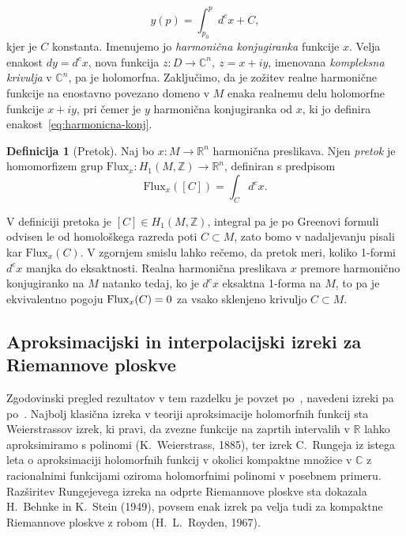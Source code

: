 \documentclass[12pt,a4paper,twoside]{article}
\theoremstyle{definition} %
\newtheorem{definicija}{Definicija}[section]
\theoremstyle{plain} %
\numberwithin{equation}{section}  %
\newcommand{\R}{\mathbb R}
\newcommand{\Z}{\mathbb Z}
\newcommand{\C}{\mathbb C}
\begin{document}
\begin{equation} \label{eq:harmonicna-konj}
y(p) = \int_{p_0}^{p} d^{c}x + C,
\end{equation}
kjer je $C$ konstanta. Imenujemo jo \emph{harmonična konjugiranka} funkcije $x$. Velja enakost $dy = d^{c}x$, nova funkcija $z \colon D \to \mathbb{C}^{n}, \ z = x+iy$, imenovana \emph{kompleksna krivulja} v $\mathbb{C}^{n}$, pa je holomorfna. Zaključimo, da je zožitev realne harmonične funkcije na enostavno povezano domeno v $M$ enaka realnemu delu holomorfne funkcije $x+iy$, pri čemer je $y$ harmonična konjugiranka od $x$, ki jo definira enakost~\eqref{eq:harmonicna-konj}.

\begin{definicija} [Pretok]
Naj bo $x \colon M \to \R^{n}$ harmonična preslikava. Njen \emph{pretok} je homomorfizem grup $\text{Flux}_{x} \colon H_{1} (M, \Z) \to \R^{n}$, definiran s predpisom 
\begin{equation} \label{eq:pretok}
\text{Flux}_{x} ([C]) = \int_{C} {d^{c} x}.
\end{equation}
\end{definicija}
%
V definiciji pretoka je $[C] \in H_{1} (M, \Z)$, integral pa je po Greenovi formuli odvisen le od homološkega razreda poti $C \subset M$, zato bomo v nadaljevanju pisali kar $\text{Flux}_{x} (C)$. V zgornjem smislu lahko rečemo, da pretok meri, koliko 1-formi $d^{c}x$ manjka do eksaktnosti. Realna harmonična preslikava $x$ premore harmonično konjugiranko na $M$ natanko tedaj, ko je $d^{c}x$ eksaktna 1-forma na $M$, to pa je ekvivalentno pogoju $\textup{Flux}_{x}(C)=0$ za vsako sklenjeno krivuljo $C \subset M$.

\subsection{Aproksimacijski in interpolacijski izreki za Riemannove ploskve}
%
Zgodovinski pregled rezultatov v tem razdelku je povzet po~\cite{fornaess2020holomorphic}, navedeni izreki pa po~\cite[Section~1.12]{alarcon2021minimal}. \newline
Najbolj klasična izreka v teoriji aproksimacije holomorfnih funkcij sta Weierstrassov izrek, ki pravi, da zvezne funkcije na zaprtih intervalih v $\R$ lahko aproksimiramo s polinomi (K.~Weierstrass, 1885), ter izrek C.~Rungeja iz istega leta o aproksimaciji holomorfnih funkcij v okolici kompaktne množice v $\C$ z racionalnimi funkcijami oziroma holomorfnimi polinomi v posebnem primeru. Razširitev Rungejevega izreka na odprte Riemannove ploskve sta dokazala H.~Behnke in K.~Stein (1949), povsem enak izrek pa velja tudi za kompaktne Riemannove ploskve z robom (H.~L.~Royden, 1967).
\end{document}
